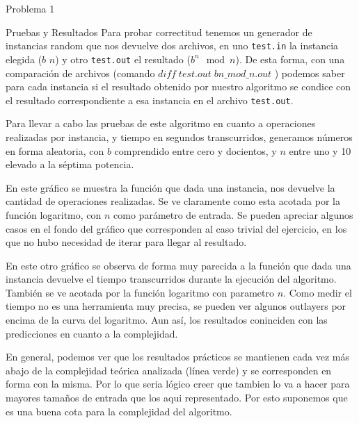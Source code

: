\begin{section}{Problema 1}
	\begin{subsection}{Pruebas y Resultados}
		Para probar correctitud tenemos un generador de instancias random que nos devuelve dos archivos, en uno \texttt{test.in} la instancia elegida ($b$ $n$) y otro \texttt{test.out} el resultado ($b^n \mod n$). De esta forma, con una comparación de archivos (comando $diff\;test.out\;bn\_mod\_n.out$ ) podemos saber para cada instancia si el resultado obtenido por nuestro algoritmo se condice con el resultado correspondiente a esa instancia en el archivo \texttt{test.out}.
		
		Para llevar a cabo las pruebas de este algoritmo en cuanto a operaciones realizadas por instancia, y tiempo en segundos transcurridos, generamos números en forma aleatoria, con $b$ comprendido entre cero y docientos, y $n$ entre uno y 10 elevado a la séptima potencia.\\
		
		\VSP
		
		En este gráfico se muestra la función que dada una instancia, nos devuelve la cantidad de operaciones realizadas. Se ve claramente como esta acotada por la función logaritmo, con $n$ como parámetro de entrada. Se pueden apreciar algunos casos en el fondo del gráfico que corresponden al caso trivial del ejercicio, en los que no hubo necesidad de iterar para llegar al resultado.

		\VSP

		En este otro gráfico se observa de forma muy parecida a la función que dada una instancia devuelve el tiempo transcurridos durante la ejecución del algoritmo. También se ve acotada por la función logaritmo con parametro $n$. Como medir el tiempo no es una herramienta muy precisa, se pueden ver algunos outlayers por encima de la curva del logaritmo. Aun así, los resultados coninciden con las predicciones en cuanto a la complejidad.\Pa

		En general, podemos ver que los resultados prácticos se mantienen cada vez más abajo de la complejidad teórica analizada (línea verde) y se corresponden en forma con la misma. Por lo que seria lógico creer que tambien lo va a hacer para mayores tamaños de entrada que los aqui representado.
		Por esto suponemos que es una buena cota para la complejidad del algoritmo.
	\end{subsection}

\end{section}

